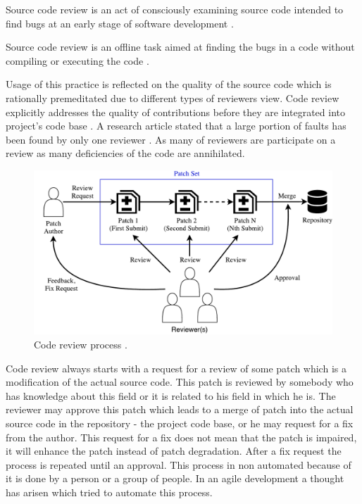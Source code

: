 \begin{DEF}
Source code review is an act of consciously examining source code intended to find bugs at an early stage of software development \cite{CodeReview_eye_tracking}.
\end{DEF}

\begin{DEF}
Source code review is an offline task aimed at finding the bugs in a code without compiling or executing the code \cite{CodeReview_eye_tracking}.
\end{DEF}

Usage of this practice is reflected on the quality of the source code which is rationally premeditated due to different types of reviewers view. Code review explicitly addresses the quality of contributions before they are integrated into project's code base \cite{CodeReview_quality}. A research article stated that a large portion of faults has been found by only one reviewer \cite{CodeReview_evaluation}. As many of reviewers are participate on a review as many deficiencies of the code are annihilated.

\begin{figure}[H]
    \centering
    \includegraphics[scale=0.5]{img/process_of_review.pdf}
    \caption{Code review process \cite{CodeReview_IFstatement}.}
    \label{fig:review_process}
\end{figure}

Code review always starts with a request for a review of some patch which is a modification of the actual source code. This patch is reviewed by somebody who has knowledge about this field or it is related to his field in which he is. The reviewer may approve this patch which leads to a merge of patch into the actual source code in the repository - the project code base, or he may request for a fix from the author. This request for a fix does not mean that the patch is impaired, it will enhance the patch instead of patch degradation. After a fix request the process is repeated until an approval. This process in non automated because of it is done by a person or a group of people. In an agile development a thought has arisen which tried to automate this process.

